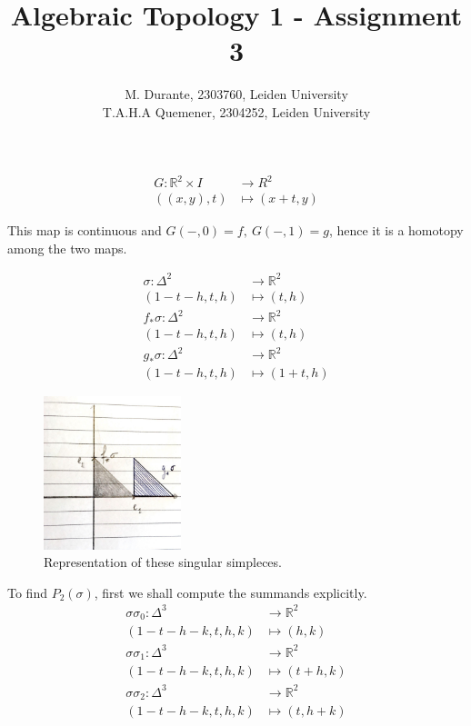 \documentclass{article}
\newcommand{\numberset}{\mathbb}
\newcommand{\R}{\numberset{R}}
\newcommand{\exercise}[1]{\noindent {\bf Exercise #1}}
\begin{document}
\title{Algebraic Topology 1 - Assignment 3}

\author{M. Durante, 2303760, Leiden University\\T.A.H.A Quemener, 2304252, Leiden University}

\maketitle


\exercise{1}

\begin{align*}
		G:\R^2\times I & \rightarrow R^2 \\
		((x,y),t) & \mapsto (x+t,y)
\end{align*}

This map is continuous and $G(-,0)=f,\ G(-,1)=g$, hence it is a homotopy among the two maps.

\begin{align*}
		\sigma:\Delta^2 & \rightarrow \R^2 \\
		(1-t-h,t,h) & \mapsto (t,h) \\
		f_*\sigma:\Delta^2 & \rightarrow \R^2 \\
		(1-t-h,t,h) & \mapsto (t,h) \\
		g_*\sigma:\Delta^2 & \rightarrow \R^2 \\
		(1-t-h,t,h) & \mapsto (1+t,h)
\end{align*}

\begin{figure}
		\includegraphics[width=4cm]{pic1ass3at1.jpg}
		\caption{Representation of these singular simpleces.}
\end{figure}

To find $P_2(\sigma)$, first we shall compute the summands explicitly.
\begin{align*}
		\sigma\sigma_0:\Delta^3 & \rightarrow\R^2 \\
		(1-t-h-k,t,h,k) & \mapsto (h,k) \\
		\sigma\sigma_1:\Delta^3 & \rightarrow\R^2 \\
		(1-t-h-k,t,h,k) & \mapsto (t+h,k) \\
		\sigma\sigma_2:\Delta^3 & \rightarrow\R^2 \\
		(1-t-h-k,t,h,k) & \mapsto (t,h+k)
\end{align*}
\end{document}
